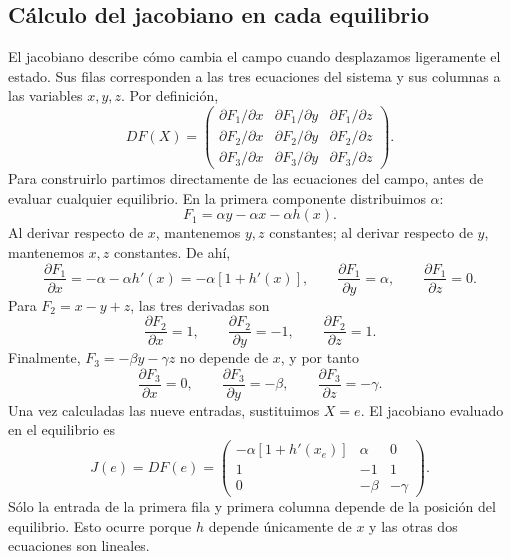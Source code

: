 \fi
\ifnum{}\relax
\subsection{Cálculo del jacobiano en cada equilibrio}
\label{app:jacobianos}

El jacobiano describe cómo cambia el campo cuando desplazamos ligeramente
el estado. Sus filas corresponden a las tres ecuaciones del sistema y sus
columnas a las variables \(x,y,z\). Por definición,
\[
DF(X)=
\begin{pmatrix}
\partial F_1/\partial x&\partial F_1/\partial y&\partial F_1/\partial z\\
\partial F_2/\partial x&\partial F_2/\partial y&\partial F_2/\partial z\\
\partial F_3/\partial x&\partial F_3/\partial y&\partial F_3/\partial z
\end{pmatrix}.
\]
Para construirlo partimos directamente de las ecuaciones del campo, antes
de evaluar cualquier equilibrio. En la primera componente distribuimos
\(\alpha\):
\[
F_1=\alpha y-\alpha x-\alpha h(x).
\]
Al derivar respecto de \(x\), mantenemos \(y,z\) constantes; al derivar
respecto de \(y\), mantenemos \(x,z\) constantes. De ahí,
\[
\frac{\partial F_1}{\partial x}=-\alpha-\alpha h'(x)
=-\alpha[1+h'(x)],\qquad
\frac{\partial F_1}{\partial y}=\alpha,\qquad
\frac{\partial F_1}{\partial z}=0.
\]
Para \(F_2=x-y+z\), las tres derivadas son
\[
\frac{\partial F_2}{\partial x}=1,\qquad
\frac{\partial F_2}{\partial y}=-1,\qquad
\frac{\partial F_2}{\partial z}=1.
\]
Finalmente, \(F_3=-\beta y-\gamma z\) no depende de \(x\), y por tanto
\[
\frac{\partial F_3}{\partial x}=0,\qquad
\frac{\partial F_3}{\partial y}=-\beta,\qquad
\frac{\partial F_3}{\partial z}=-\gamma.
\]
Una vez calculadas las nueve entradas, sustituimos \(X=e\). El jacobiano
evaluado en el equilibrio es
\begin{equation}
J(e)=DF(e)=
\begin{pmatrix}
-\alpha[1+h'(x_e)]&\alpha&0\\
1&-1&1\\
0&-\beta&-\gamma
\end{pmatrix}.
\label{eq:jacobiano_lure}
\end{equation}
Sólo la entrada de la primera fila y primera columna depende de la posición
del equilibrio. Esto ocurre porque \(h\) depende únicamente de \(x\) y las
otras dos ecuaciones son lineales.

